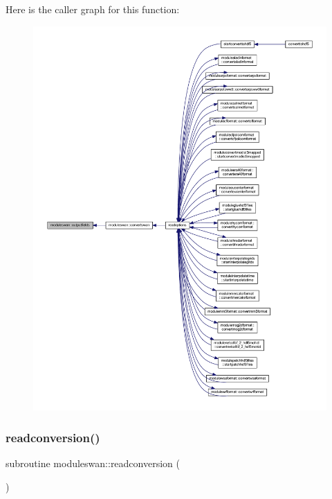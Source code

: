 Here is the caller graph for this function\+:\nopagebreak
\begin{figure}[H]
\begin{center}
\leavevmode
\includegraphics[width=350pt]{namespacemoduleswan_a2d1606342b5a9024053f2fceb16ae444_icgraph}
\end{center}
\end{figure}
\mbox{\label{namespacemoduleswan_ad7b64582ddb44426de0dd83c9c0b9b42}} 
\subsubsection{\texorpdfstring{readconversion()}{readconversion()}}
{\footnotesize\ttfamily subroutine moduleswan\+::readconversion (\begin{DoxyParamCaption}{ }\end{DoxyParamCaption})\hspace{0.3cm}{\ttfamily [private]}}

